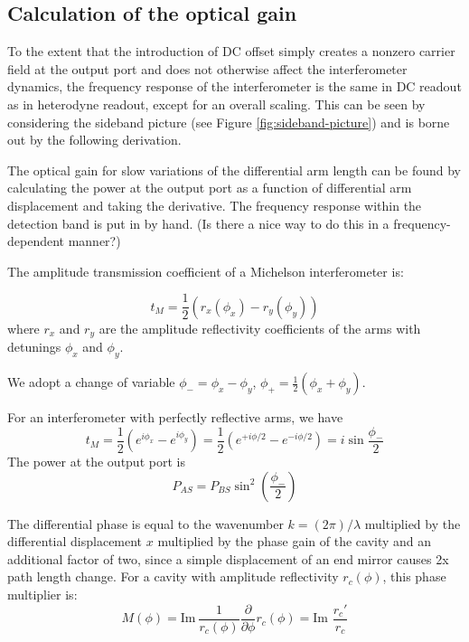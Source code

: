 \subsection{Calculation of the optical gain}

To the extent that the introduction of DC offset simply creates a
nonzero carrier field at the output port and does not otherwise affect
the interferometer dynamics, the frequency response of the interferometer
is the same in DC readout as in heterodyne readout, except for an
overall scaling. This can be seen by considering the sideband picture
(see Figure \ref{fig:sideband-picture}) and is borne out by the following
derivation.%

The optical gain for slow variations of the differential arm length
can be found by calculating the power at the output port as a function
of differential arm displacement and taking the derivative. The frequency
response within the detection band is put in by hand. (Is there a
nice way to do this in a frequency-dependent manner?)

The amplitude transmission coefficient of a Michelson interferometer
is:

\begin{equation}
t_{M}=\frac{1}{2}\left(r_{x}\left(\phi_{x}\right)-r_{y}\left(\phi_{y}\right)\right)\end{equation}
where $r_{x}$ and $r_{y}$ are the amplitude reflectivity coefficients
of the arms with detunings $\phi_{x}$ and $\phi_{y}$. 

We adopt a change of variable $\phi_{-}=\phi_{x}-\phi_{y}$, $\phi_{+}=\frac{1}{2}\left(\phi_{x}+\phi_{y}\right)$.

For an interferometer with perfectly reflective arms, we have\begin{equation}
t_{M}=\frac{1}{2}\left(e^{i\phi_{x}}-e^{i\phi_{y}}\right)=\frac{1}{2}\left(e^{+i\phi/2}-e^{-i\phi/2}\right)=i\sin\frac{\phi_{-}}{2}\end{equation}
The power at the output port is \begin{equation}
P_{AS}=P_{BS}\sin^{2}\left(\frac{\phi_{-}}{2}\right)\end{equation}


The differential phase is equal to the wavenumber $k=(2\pi)/\lambda$
multiplied by the differential displacement $x$ multiplied by the
phase gain of the cavity and an additional factor of two, since a
simple displacement of an end mirror causes 2x path length change.
For a cavity with amplitude reflectivity $r_{c}(\phi)$, this phase
multiplier is:\[
M(\phi)=\mathrm{Im\ }\frac{1}{r_{c}(\phi)}\frac{\partial}{\partial\phi}r_{c}(\phi)=\text{Im\ }\frac{r_{c}'}{r_{c}}\]


